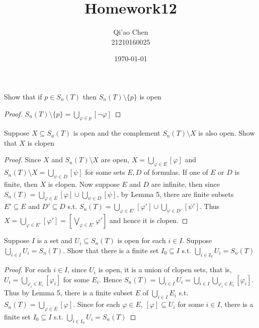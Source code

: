\documentclass[11pt]{article}
\author{Qi'ao Chen\\21210160025}
\date{\today}
\title{Homework12}
\begin{document}
\maketitle
\begin{exercise}
Show that if \(p\in S_n(T)\) then \(S_n(T)\setminus\{p\}\) is open
\end{exercise}

\begin{proof}
\(S_n(T)\setminus\{p\}=\bigcup_{\varphi\in p}[\neg\varphi]\)
\end{proof}

\begin{exercise}
Suppose \(X\subseteq S_n(T)\) is open and the complement \(S_n(T)\setminus X\) is also open. Show that \(X\) is clopen
\end{exercise}

\begin{proof}
Since \(X\) and \(S_n(T)\setminus X\) are open, \(X=\bigcup_{\varphi\in E}[\varphi]\) and \(S_n(T)\setminus X=\bigcup_{\psi\in D}[\psi]\) for some
sets \(E,D\) of formulas. If one of \(E\) or \(D\) is finite, then \(X\) is clopen. Now
suppose \(E\) and \(D\) are infinite, then since \(S_n(T)=\bigcup_{\varphi\in E}[\varphi]\cup\bigcup_{\psi\in D}[\psi]\), by Lemma 5,
there are finite subsets \(E'\subseteq E\) and \(D'\subseteq D\) s.t. \(S_n(T)=\bigcup_{\varphi\in E'}[\varphi']\cup\bigcup_{\psi\in D'}[\psi']\).
Thus \(X=\bigcup_{\varphi\in E'}[\varphi']=[\bigvee_{\varphi\in E'}\varphi']\) and hence it is clopen.
\end{proof}

\begin{exercise}
Suppose \(I\) is a set and \(U_i\subseteq S_n(T)\) is open for each \(i\in I\). Suppose \(\bigcup_{i\in I}U_i=S_n(T)\).
Show that there is a finite set \(I_0\subseteq I\) s.t. \(\bigcup_{i\in I_0}U_i=S_n(T)\)
\end{exercise}

\begin{proof}
For each \(i\in I\), since \(U_i\) is open, it is a union of clopen sets, that
is, \(U_i=\bigcup_{\varphi_i\in E_i}[\varphi_i]\) for some \(E_i\). Hence \(S_n(T)=\bigcup_{i\in I}U_i=\bigcup_{i\in  I}\bigcup_{\varphi_i\in E_i}[\varphi_i]\). Thus
by Lemma 5, there is a finite subset \(E\) of \(\bigcup_{i\in I}E_i\) s.t. \(S_n(T)=\bigcup_{\varphi\in E}[\varphi]\). Since
for each \(\varphi\in E\), \([\varphi]\subseteq U_i\) for some \(i\in I\), there is a finite set \(I_0\subseteq I\) s.t. \(\bigcup_{i\in I_0}U_i=S_n(T)\)
\end{proof}
\end{document}
